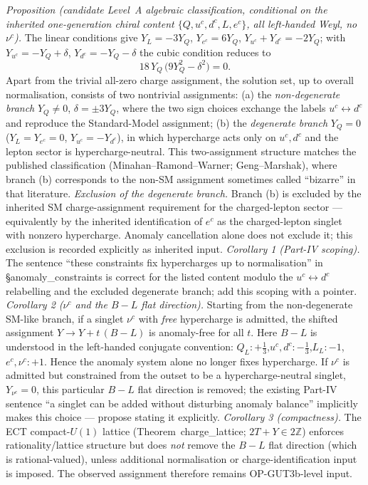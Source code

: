 \emph{Proposition (candidate Level~A algebraic classification,
conditional on the inherited one-generation chiral content
$\{Q,u^c,d^c,L,e^c\}$, all left-handed Weyl, no $\nu^c$).}
The linear conditions give $Y_L=-3Y_Q$, $Y_{e^c}=6Y_Q$,
$Y_{u^c}+Y_{d^c}=-2Y_Q$; with $Y_{u^c}=-Y_Q+\delta$,
$Y_{d^c}=-Y_Q-\delta$ the cubic condition reduces to
\[
18\,Y_Q\,\bigl(9Y_Q^2-\delta^2\bigr)=0 .
\]
Apart from the trivial all-zero charge assignment, the solution set,
up to overall normalisation, consists of two nontrivial assignments:
(a) the \emph{non-degenerate branch} $Y_Q\neq0$,
$\delta=\pm3Y_Q$, where the two sign choices exchange the labels
$u^c\!\leftrightarrow\! d^c$ and reproduce the Standard-Model
assignment;
(b) the \emph{degenerate branch} $Y_Q=0$
($Y_L=Y_{e^c}=0$, $Y_{u^c}=-Y_{d^c}$), in which hypercharge acts
only on $u^c,d^c$ and the lepton sector is hypercharge-neutral.
This two-assignment structure matches the published classification
(Minahan--Ramond--Warner; Geng--Marshak), where branch (b) corresponds to the non-SM assignment sometimes
called ``bizarre'' in that literature.
\emph{Exclusion of the degenerate branch.}
Branch (b) is excluded by the inherited SM charge-assignment
requirement for the charged-lepton sector --- equivalently by the
inherited identification of $e^c$ as the charged-lepton singlet
with nonzero hypercharge.
Anomaly cancellation alone does not exclude it; this exclusion is
recorded explicitly as inherited input.
\emph{Corollary 1 (Part-IV scoping).}
The sentence ``these constraints fix hypercharges up to
normalisation'' in \S anomaly\_constraints is correct for the
listed content modulo the $u^c\!\leftrightarrow\! d^c$ relabelling
and the excluded degenerate branch; add this scoping with a
pointer.
\emph{Corollary 2 ($\nu^c$ and the $B{-}L$ flat direction).}
Starting from the non-degenerate SM-like branch, if a singlet $\nu^c$
with \emph{free} hypercharge is admitted, the shifted assignment
$Y\to Y+t\,(B{-}L)$ is anomaly-free for all $t$.
Here $B{-}L$ is understood in the left-handed conjugate convention:
$Q_L:+\tfrac13$,\quad $u^c,d^c:-\tfrac13$,\quad $L_L:-1$,\quad
$e^c,\nu^c:+1$.
Hence the anomaly system alone no longer fixes hypercharge.
If $\nu^c$ is admitted but constrained from the outset to be a
hypercharge-neutral singlet, $Y_{\nu^c}=0$, this particular
$B{-}L$ flat direction is removed; the existing Part-IV sentence ``a singlet can
be added without disturbing anomaly balance'' implicitly makes this
choice --- propose stating it explicitly.
\emph{Corollary 3 (compactness).}
The ECT compact-$U(1)$ lattice (Theorem~charge\_lattice;
$2T+Y\in2\mathbb Z$) enforces rationality/lattice structure but
does \emph{not} remove the $B{-}L$ flat direction (which is
rational-valued), unless additional normalisation or
charge-identification input is imposed.
The observed assignment therefore remains OP-GUT3b-level input.


